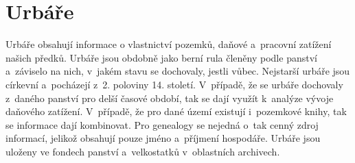 \section{Urbáře}
Urbáře \cite{SestavteSiRodokmen, urbare} obsahují informace o vlastnictví pozemků, daňové a~pracovní zatížení našich předků. Urbáře jsou obdobně jako berní rula členěny podle panství a~záviselo na nich, v~jakém stavu se dochovaly, jestli vůbec. Nejstarší urbáře jsou církevní a~pocházejí z~2. poloviny 14. století. V~případě, že se urbáře dochovaly z~daného panství pro delší časové období, tak se dají využít k~analýze vývoje daňového zatížení. V~případě, že pro dané území existují i~pozemkové knihy, tak se informace dají kombinovat. Pro genealogy se nejedná o~tak cenný zdroj informací, jelikož obsahují pouze jméno a~příjmení hospodáře. Urbáře jsou uloženy ve fondech panství a~velkostatků v~oblastních archivech.